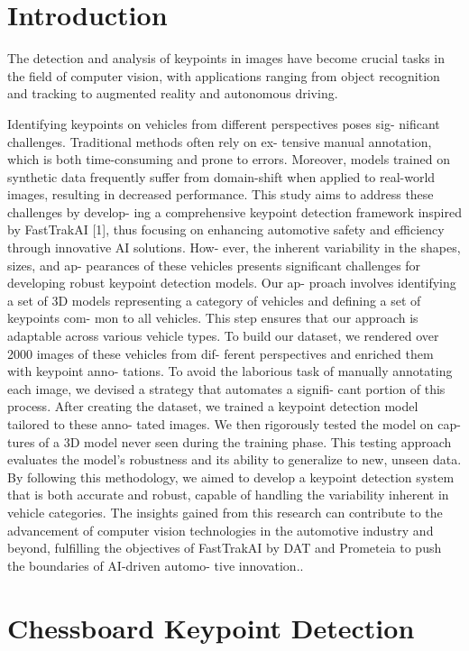 \documentclass[conference]{IEEEtran}
\begin{document}
\section{Introduction}
The detection and analysis of keypoints in images have
become crucial tasks in the field of computer vision, with
applications ranging from object recognition and tracking
to augmented reality and autonomous driving. 

Identifying
keypoints on vehicles from different perspectives poses sig-
nificant challenges. Traditional methods often rely on ex-
tensive manual annotation, which is both time-consuming
and prone to errors. Moreover, models trained on synthetic
data frequently suffer from domain-shift when applied to
real-world images, resulting in decreased performance.
This study aims to address these challenges by develop-
ing a comprehensive keypoint detection framework inspired
by FastTrakAI [1], thus focusing on enhancing automotive
safety and efficiency through innovative AI solutions. How-
ever, the inherent variability in the shapes, sizes, and ap-
pearances of these vehicles presents significant challenges
for developing robust keypoint detection models. Our ap-
proach involves identifying a set of 3D models representing
a category of vehicles and defining a set of keypoints com-
mon to all vehicles. This step ensures that our approach is
adaptable across various vehicle types. To build our dataset,
we rendered over 2000 images of these vehicles from dif-
ferent perspectives and enriched them with keypoint anno-
tations. To avoid the laborious task of manually annotating
each image, we devised a strategy that automates a signifi-
cant portion of this process. After creating the dataset, we
trained a keypoint detection model tailored to these anno-
tated images. We then rigorously tested the model on cap-
tures of a 3D model never seen during the training phase.
This testing approach evaluates the model’s robustness and
its ability to generalize to new, unseen data. By following
this methodology, we aimed to develop a keypoint detection
system that is both accurate and robust, capable of handling
the variability inherent in vehicle categories. The insights
gained from this research can contribute to the advancement
of computer vision technologies in the automotive industry
and beyond, fulfilling the objectives of FastTrakAI by DAT
and Prometeia to push the boundaries of AI-driven automo-
tive innovation..


\section{Chessboard Keypoint Detection}
\end{document}
